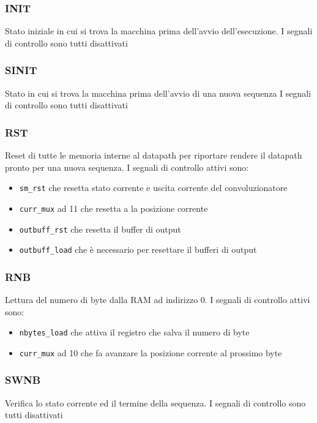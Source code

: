 \documentclass[12pt, a4paper]{article}
\begin{document}
\subsubsection{INIT}
Stato iniziale in cui si trova la macchina prima dell'avvio dell'esecuzione.
I segnali di controllo sono tutti disattivati

\subsubsection{SINIT}
Stato in cui si trova la macchina prima dell'avvio di una nuova sequenza
I segnali di controllo sono tutti disattivati

\subsubsection{RST}
Reset di tutte le memoria interne al datapath per riportare rendere il datapath pronto per
una nuova sequenza. 
I segnali di controllo attivi sono:
\begin{itemize}
    \item \texttt{sm\_rst} che resetta stato corrente e uscita corrente del convoluzionatore
    \item \texttt{curr\_mux} ad 11 che resetta a la posizione corrente
    \item \texttt{outbuff\_rst} che resetta il buffer di output
    \item \texttt{outbuff\_load} che è necessario per resettare il bufferi di output
\end{itemize}

\subsubsection{RNB}
Lettura del numero di byte dalla RAM ad indirizzo 0.
I segnali di controllo attivi sono:
\begin{itemize}
    \item \texttt{nbytes\_load} che attiva il registro che salva il numero di byte
    \item \texttt{curr\_mux} ad 10 che fa avanzare la posizione corrente al prossimo byte
\end{itemize}

\subsubsection{SWNB}
Verifica lo stato corrente ed il termine della sequenza.
I segnali di controllo sono tutti disattivati
\end{document}
